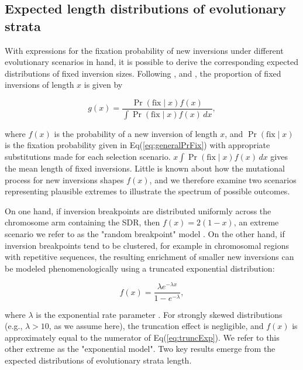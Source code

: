 \documentclass{article}
\begin{document}
\subsection*{Expected length distributions of evolutionary strata} \label{subsec:DistFixedInv}

With expressions for the fixation probability of new inversions under different evolutionary scenarios in hand, it is possible to derive the corresponding expected distributions of fixed inversion sizes. Following \citet{vanValenLevins1968, Santos1986}, and \citet{ConnallonOlito2020}, the proportion of fixed inversions of length $x$ is given by 

\begin{equation} \label{eq:generalInvSizeModel}
	g(x) = \frac{\Pr(\text{fix} \mid x) f(x)} {\int \Pr(\text{fix} \mid x) f(x)\,dx},
\end{equation}

\noindent where $f(x)$ is the probability of a new inversion of length $x$, and $\Pr(\text{fix} \mid x)$ is the fixation probability given in Eq(\ref{eq:generalPrFix}) with appropriate substitutions made for each selection scenario. $x\int \Pr(\text{fix} \mid x) f(x)\,dx$ gives the mean length of fixed inversions. Little is known about how the mutational process for new inversions shapes $f(x)$, and we therefore examine two scenarios representing plausible extremes to illustrate the spectrum of possible outcomes.

On one hand, if inversion breakpoints are distributed uniformly across the chromosome arm containing the SDR, then $f(x) = 2(1 - x)$, an extreme scenario we refer to as the "random breakpoint" model \citep{vanValenLevins1968}. On the other hand, if inversion breakpoints tend to be clustered, for example in chromosomal regions with repetitive sequences, the resulting enrichment of smaller new inversions can be modeled phenomenologically using a truncated exponential distribution:

\begin{equation} \label{eq:truncExp}
	f(x) = \frac{ \lambda e^{-\lambda x}} {1 - e^{-\lambda}},
\end{equation}

\noindent where $\lambda$ is the exponential rate parameter \citep{PevznerTesler2003, PengPevznerTesler2006, ChengKirkpatrick2019,ConnallonOlito2020}. For strongly skewed distributions (e.g., $\lambda > 10$, as we assume here), the truncation effect is negligible, and $f(x)$ is approximately equal to the numerator of Eq(\ref{eq:truncExp}). We refer to this other extreme as the "exponential model". Two key results emerge from the expected distributions of evolutionary strata length.
\end{document}

